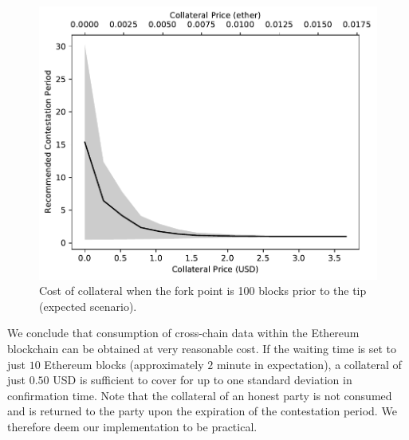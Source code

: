 \begin{figure}
    \centering
        \centering
        \includegraphics[width=1.036\columnwidth]{figures/cryptoeconomics-collateral-100.pdf}
        \caption{Cost of collateral when the fork point is 100 blocks prior to the
        tip (expected scenario).}
        \label{fig:cryptoeconomics-collateral-100}
\end{figure}

We conclude that consumption of cross-chain data within the Ethereum blockchain
can be obtained at very reasonable cost. If the waiting time is set to just
$10$ Ethereum blocks (approximately $2$ minute in expectation), a collateral of
just $0.50$ USD is sufficient to cover for up to one standard deviation in
confirmation time. Note that the collateral of an honest party is not consumed
and is returned to the party upon the expiration of the contestation period. We
therefore deem our implementation to be practical.


